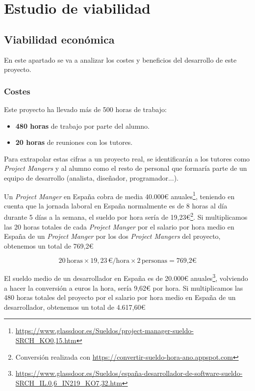 
\section{Estudio de viabilidad}

\subsection{Viabilidad económica}

En este apartado se va a analizar los costes y beneficios del desarrollo de este proyecto.

\subsubsection{Costes}
 
Este proyecto ha llevado más de 500 horas de trabajo:\begin{itemize}
    \item \textbf{480 horas} de trabajo por parte del alumno.
    \item \textbf{20 horas} de reuniones con los tutores.
\end{itemize}  

Para extrapolar estas cifras a un proyecto real, se identificarán a los tutores como \textit{Project Mangers} y al alumno como el resto de personal que formaría parte de un equipo de desarrollo (analista, diseñador, programador...).

Un \textit{Project Manger} en España cobra de media 40.000€ anuales\footnote{\url{https://www.glassdoor.es/Sueldos/project-manager-sueldo-SRCH_KO0,15.htm}}, teniendo en cuenta que la jornada laboral en España normalmente es de 8 horas al día durante 5 días a la semana, el sueldo por hora sería de 19,23€\footnote{Conversión realizada con \url{https://convertir-sueldo-hora-ano.appspot.com}}.
Si multiplicamos las 20 horas totales de cada \textit{Project Manger} por el salario por hora medio en España de un \textit{Project Manger} por los dos \textit{Project Mangers} del proyecto, obtenemos un total de 769,2€

$$20 \, \text{horas} \times 19,23 \, \text{€/hora} \times 2 \, \text{personas} = \text{769,2€}$$

El sueldo medio de un desarrollador en España es de 20.000€ anuales\footnote{\url{https://www.glassdoor.es/Sueldos/españa-desarrollador-de-software-sueldo-SRCH_IL.0,6_IN219_KO7,32.htm}}, volviendo a hacer la conversión a euros la hora, sería 9,62€ por hora.
Si multiplicamos las 480 horas totales del proyecto por el salario por hora medio en España de un desarrollador, obtenemos un total de 4.617,60€

